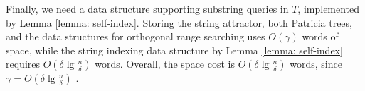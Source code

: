 \documentclass[smallabstract,smallcaptions]{dccpaper}
\begin{document}
	Finally, we need a data structure supporting substring queries in $T$, implemented by Lemma \ref{lemma: self-index}. 
	Storing the string attractor, both Patricia trees, and the data structures for orthogonal range searching uses $O(\gamma)$ words of space, while the string indexing data structure by Lemma \ref{lemma: self-index} requires $O(\delta \lg \frac{n}{\delta})$ words.
	Overall, the space cost is $O(\delta \lg \frac{n}{\delta})$ words, since $\gamma=O(\delta \lg \frac{n}{\delta})$ \cite{kociumaka2021towards}.
	
\end{document}
